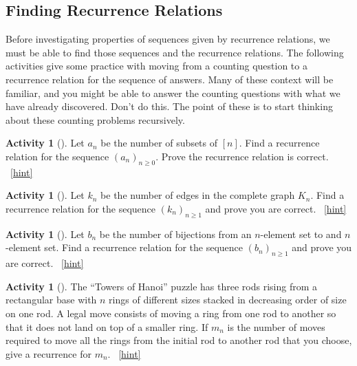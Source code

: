 \documentclass[10pt,]{book}
\theoremstyle{plain}
\theoremstyle{definition}
\theoremstyle{definition}
\theoremstyle{definition}
\newtheorem{activity}[project]{Activity}
\numberwithin{equation}{chapter}
\begin{document}
\subsection[{Finding Recurrence Relations}]{Finding Recurrence Relations}\label{subsec-recursionfinding}
\hypertarget{p-894}{}%
Before investigating properties of sequences given by recurrence relations, we must be able to find those sequences and the recurrence relations.  The following activities give some practice with moving from a counting question to a recurrence relation for the sequence of answers.  Many of these context will be familiar, and you might be able to answer the counting questions with what we have already discovered.  Don't do this.  The point of these is to start thinking about these counting problems recursively.%
\begin{activity}[]\label{activity-127}
\hypertarget{p-895}{}%
Let \(a_n\) be the number of subsets of \([n]\).  Find a recurrence relation for the sequence \((a_n)_{n \ge 0}\).  Prove the recurrence relation is correct.%
~\hfill{\tiny\hyperlink{a-134}{[hint]}\hypertarget{q-134}{}}\end{activity}
\begin{activity}[]\label{activity-128}
\hypertarget{p-897}{}%
Let \(k_n\) be the number of edges in the complete graph \(K_n\).  Find a recurrence relation for the sequence \((k_n)_{n \ge 1}\) and prove you are correct.%
~\hfill{\tiny\hyperlink{a-135}{[hint]}\hypertarget{q-135}{}}\end{activity}
\begin{activity}[]\label{activity-129}
\hypertarget{p-899}{}%
Let \(b_n\) be the number of bijections from an \(n\)-element set to and \(n\)-element set.  Find a recurrence relation for the sequence \((b_n)_{n \ge 1}\) and prove you are correct.%
~\hfill{\tiny\hyperlink{a-136}{[hint]}\hypertarget{q-136}{}}\end{activity}
\begin{activity}[]\label{HanoiProblem}
\hypertarget{p-901}{}%
The ``Towers of Hanoi'' puzzle has three rods rising from a rectangular base with \(n\) rings of different sizes stacked in decreasing order of size on one rod. A legal move consists of moving a ring from one rod to another so that it does not land on top of a smaller ring. If \(m_n\) is the number of moves required to move all the rings from the initial rod to another rod that you choose, give a recurrence for \(m_n\).%
~\hfill{\tiny\hyperlink{a-137}{[hint]}\hypertarget{q-137}{}}\end{activity}
\end{document}
